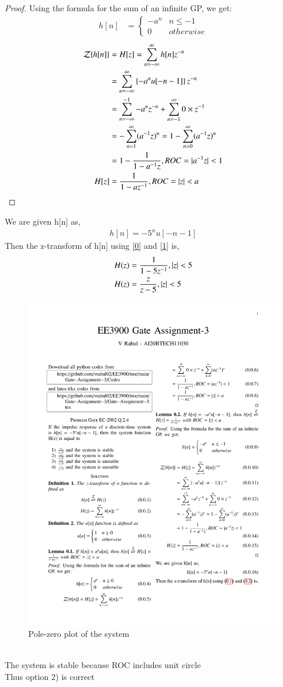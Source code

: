 \documentclass[journal,12pt,twocolumn]{IEEEtran}
\begin{document}
\begin{proof}
Using the formula for the sum of an infinite GP, we get:
\begin{align}
    h[n] &= 
    \begin{cases}
    -a^n & n\leq -1\\
    0 & otherwise
    \end{cases}
\end{align}
\begin{align}
    \mathcal{Z}\{h[n]\} &= H[z] = \sum_{n = -\infty}^\infty h[n]z^{-n}\\
   &= \sum_{n = -\infty}^\infty \left\{-a^nu[-n-1]\right\}z^{-n}\\
      &= \sum_{n = -\infty}^{-1} {-a^n}z^{-n} + \sum_{n = -1}^{\infty} 0\times z^{-1}\\
    &=-\sum_{n = 1}^{\infty} (a^{-1}z)^n =1-\sum_{n = 0}^{\infty} (a^{-1}z)^n\\
     &= 1-\frac{1}{1 - a^{-1}z} , ROC = \vert a^{-1}z\vert < 1\\
     H[z] &= \frac{1}{1 - az^{-1}} , ROC =  \vert z\vert < a
\end{align}
\end{proof}
We are given h[n] as,
\begin{align}
    h[n]=-5^nu[-n-1]
\end{align}
Then the z-transform of h[n] using \eqref{0} and \eqref{1} is,\\
\begin{align}
    H(z)&=\frac{1}{1-5z^{-1}},\vert z\vert<5\label{2}\\
    H(z)&=\frac{z}{z-5},\vert z\vert<5\label{2}
\end{align}
\begin{figure}[!ht]
    \centering
    \includegraphics[width=\columnwidth]{Gate Assignment-3}
    \caption{Pole-zero plot of the system}
    \label{a}
\end{figure}\\
The system is stable because ROC includes unit circle\\
Thus option 2) is correct
\end{document}
